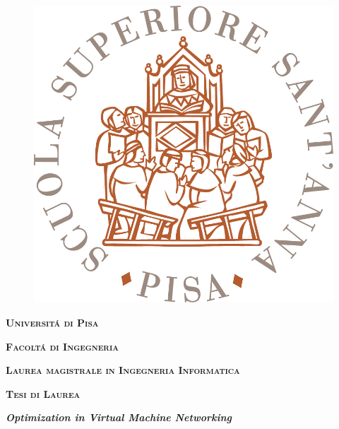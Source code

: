 \begin{titlepage}
\pagestyle{empty}
\begingroup
\vspace*{-8.5\topskip}

\begin{figure}[!h]
\begin{center}
\includegraphics[scale=0.3]{logo_sssup}
\end{center}
\end{figure}

\vspace*{-0.5cm}

\begin{center}
        \large{\bf\expandafter\textsc {Universit\'a di Pisa}}\par 
		  \large{\bf\expandafter\textsc {Facolt\'a di Ingegneria}}\par
		  \large{\bf\expandafter\textsc {Laurea magistrale in Ingegneria Informatica}}\par
        \vspace{0.5cm}
        \large{\bf\expandafter\textsc {Tesi di Laurea}}
\end{center}



\vspace{1.5cm}
\begin{center}
        {\LARGE\bf\textit{Optimization in Virtual Machine Networking}}
\end{center}


\end{titlepage}
